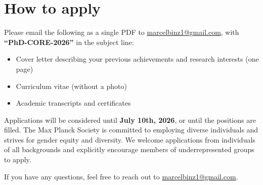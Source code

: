 \section*{How to apply}
\begin{callout}
Please email the following as a single PDF to
\href{mailto:marcelbinz1@gmail.com}{marcelbinz1@gmail.com},
with \textbf{“PhD-CORE-2026”} in the subject line:
\begin{itemize}
  \item Cover letter describing your previous achievements and research interests (one page)
  \item Curriculum vitae (without a photo)
  \item Academic transcripts and certificates
\end{itemize}

\vspace{5pt}
Applications will be considered until \textbf{July 10th, 2026}, or until the
positions are filled. The Max Planck Society is committed to employing diverse
individuals and strives for gender equity and diversity. We welcome applications
from individuals of all backgrounds and explicitly encourage members of
underrepresented groups to apply.

\vspace{5pt}
{\color{inksoft}If you have any questions, feel free to reach out to
\href{mailto:marcelbinz1@gmail.com}{marcelbinz1@gmail.com}.}
\end{callout}


